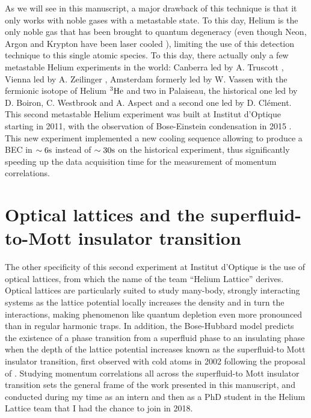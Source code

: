 As we will see in this manuscript, a major drawback of this technique is that it only works with noble gases with a metastable state. To this day, Helium is the only noble gas that has been brought to quantum degeneracy (even though Neon, Argon and Krypton have been laser cooled \cite{katori1990laser,shimizu1989laser}), limiting the use of this detection technique to this single atomic species. To this day, there actually only a few metastable Helium experiments in the world: Canberra led by A. Truscott \cite{abbas2021rapid}, Vienna led by A. Zeilinger \cite{keller2014bose}, Amsterdam formerly led by W. Vassen \cite{mcnamara2006degenerate} with the fermionic isotope of Helium $^3 \rm{He}$ and two in Palaiseau, the historical one led by D. Boiron, C. Westbrook and A. Aspect and a second one led by D. Clément. This second metastable Helium experiment was built at Institut d'Optique starting in 2011, with the observation of Bose-Einstein condensation in 2015 \cite{bouton2015fast}. This new experiment implemented a new cooling sequence allowing to produce a BEC in $\sim 6\rm{s}$ instead of $\sim 30\rm{s}$ on the historical experiment, thus significantly speeding up the data acquisition time for the measurement of momentum correlations.

\section*{Optical lattices and the superfluid-to-Mott insulator transition}

The other specificity of this second experiment at Institut d'Optique is the use of optical lattices, from which the name of the team ``Helium Lattice'' derives. Optical lattices are particularly suited to study many-body, strongly interacting systems as the lattice potential locally increases the density and in turn the interactions, making phenomenon like quantum depletion even more pronounced than in regular harmonic traps. In addition, the Bose-Hubbard model predicts the existence of a phase transition from a superfluid phase to an insulating phase when the depth of the lattice potential increases known as the superfluid-to Mott insulator transition, first observed with cold atoms in 2002 \cite{greiner2002quantum} following the proposal of \cite{jaksch1998cold}. Studying momentum correlations all across the superfluid-to Mott insulator transition sets the general frame of the work presented in this manuscript, and conducted during my time as an intern and then as a PhD student in the Helium Lattice team that I had the chance to join in 2018.

